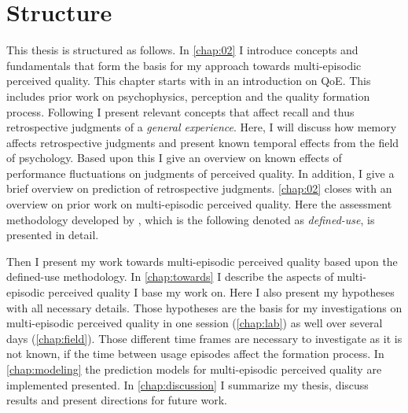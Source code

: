 \section{Structure}
This thesis is structured as follows.
In \autoref{chap:02} I introduce concepts and fundamentals that form the basis for my approach towards multi-episodic perceived quality.
This chapter starts with in an introduction on \ac{QoE}.
This includes prior work on psychophysics, perception and the quality formation process.
Following I present relevant concepts that affect recall and thus retrospective judgments of a \emph{general experience}.
Here, I will discuss how memory affects retrospective judgments and present known temporal effects from the field of psychology.
Based upon this I give an overview on known effects of performance fluctuations on judgments of perceived quality.
In addition, I give a brief overview on prediction of retrospective judgments.
\autoref{chap:02} closes with an overview on prior work on multi-episodic perceived quality.
Here the assessment methodology developed by \citet{moller_single-call_2011}, which is the following denoted as \emph{defined-use}, is presented in detail.

Then I present my work towards multi-episodic perceived quality based upon the defined-use methodology.
In \autoref{chap:towards} I describe the aspects of multi-episodic perceived quality I base my work on.
Here I also present my hypotheses with all necessary details.
Those hypotheses are the basis for my investigations on multi-episodic perceived quality in one session (\autoref{chap:lab}) as well over several days (\autoref{chap:field}).
Those different time frames are necessary to investigate as it is not known, if the time between usage episodes affect the formation process.
In \autoref{chap:modeling} the prediction models for multi-episodic perceived quality are implemented presented.
In \autoref{chap:discussion} I summarize my thesis, discuss results and present directions for future work.
